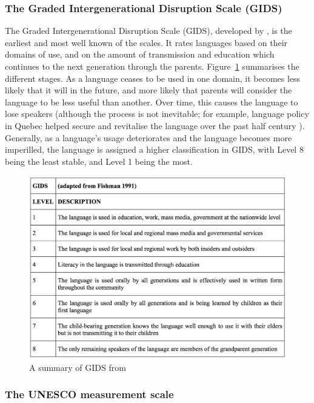 \subsubsection{The Graded Intergenerational Disruption Scale (GIDS)}

The Graded Intergenerational Disruption Scale (GIDS), developed by \citet{fishman1991reversing}, is the earliest and most well known of the scales. It rates languages based on their domains of use, and on the amount of transmission and education which continues to the next generation through the parents. Figure~\ref{fig:gids} summarises the different stages. As a language ceases to be used in one domain, it becomes less likely that it will in the future, and more likely that parents will consider the language to be less useful than another. Over time, this causes the language to lose speakers (although the process is not inevitable; for example, language policy in Quebec helped secure and revitalise the language over the past half century \citep{bourhis2001reversing}). Generally, as a language's usage deteriorates and the language becomes more imperilled, the language is assigned a higher classification in GIDS, with Level 8 being the least stable, and Level 1 being the most.

\begin{figure}
 \centering
 \includegraphics[width=1\textwidth]{img/gids.png}
 \caption{A summary of GIDS \citep{fishman1991reversing} from \citet[105]{lewis2010assessing}}
 \label{fig:gids}
\end{figure}

\subsubsection{The UNESCO measurement scale}
\label{subsec:unesco}

